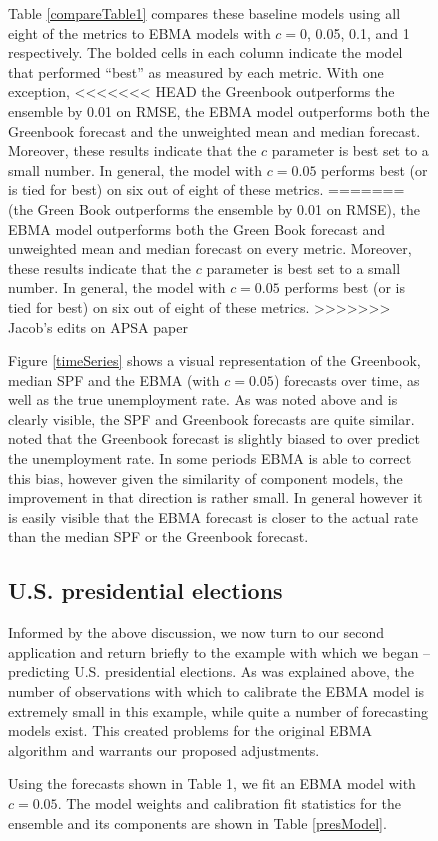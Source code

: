 \documentclass[12pt,fullpage,endnotes]{article}
\begin{document}
\begin{figure}[h]
Table \ref{compareTable1} compares these baseline models using all
eight of the metrics to EBMA models with $c=$0, 0.05, 0.1, and 1
respectively.  The bolded cells in each column indicate the model that
performed ``best'' as measured by each metric.  With one exception,
<<<<<<< HEAD
the Greenbook outperforms the ensemble by 0.01 on RMSE, the EBMA model
outperforms both the Greenbook forecast and the unweighted mean and
median forecast.  Moreover, these results indicate that the $c$
parameter is best set to a small number.  In general, the model with
$c=0.05$ performs best (or is tied for best) on six out of eight of
these metrics.
=======
(the Green Book outperforms the ensemble by 0.01 on RMSE), the EBMA
model outperforms both the Green Book forecast and unweighted mean and
median forecast on every metric.  Moreover, these results indicate
that the $c$ parameter is best set to a small number.  In general, the
model with $c=0.05$ performs best (or is tied for best) on six out of
eight of these metrics.
>>>>>>> Jacob's edits on APSA paper

Figure \ref{timeSeries} shows a visual representation of the Greenbook, median SPF and the EBMA (with $c=0.05$) forecasts over time, as well as the true unemployment rate. As was noted above and is clearly visible, the SPF and Greenbook forecasts are quite similar. \citet{Baghestani:2008} noted that the Greenbook forecast is slightly biased to over predict the unemployment rate. In some periods EBMA is able to correct this bias, however given the similarity of component models, the improvement in that direction is rather small. In general however it is easily visible that the EBMA forecast is closer to the actual rate than the median SPF or the Greenbook forecast.

\subsection{U.S. presidential elections}

Informed by the above discussion, we now turn to our second application and return briefly to the example
with which we began -- predicting U.S. presidential elections.  As was explained above, the number of observations with which to calibrate the EBMA model is extremely small in this example, while quite a number of forecasting models exist. This created problems for the original EBMA algorithm and warrants our proposed adjustments. 

Using the forecasts shown in Table 1, we fit an EBMA model with $c=0.05$.
The model weights and calibration fit statistics for the ensemble and
its components are shown in Table \ref{presModel}.



\end{figure}
\end{document}
